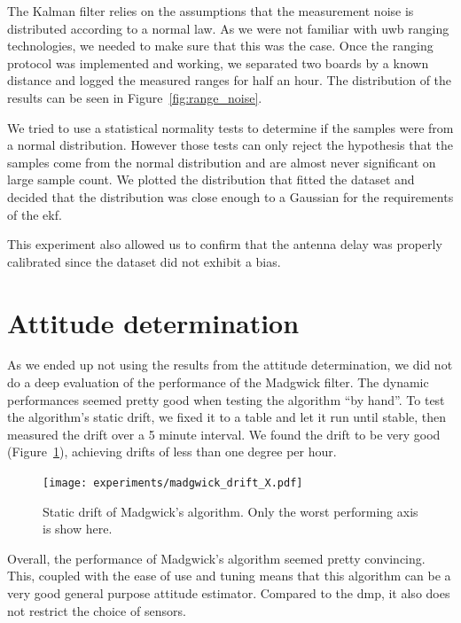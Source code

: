 \documentclass[a4paper, 12pt]{scrreprt}
\begin{document}
The Kalman filter relies on the assumptions that the measurement noise is distributed according to a normal law.
As we were not familiar with \gls{uwb} ranging technologies, we needed to make sure that this was the case.
Once the ranging protocol was implemented and working, we separated two boards by a known distance and logged the measured ranges for half an hour.
The distribution of the results can be seen in Figure~\ref{fig:range_noise}.

We tried to use a statistical normality tests to determine if the samples were from a normal distribution.
However those tests can only reject the hypothesis that the samples come from the normal distribution and are almost never significant on large sample count.
We plotted the distribution that fitted the dataset and decided that the distribution was close enough to a Gaussian for the requirements of the \gls{ekf}.

This experiment also allowed us to confirm that the antenna delay was properly calibrated since the dataset did not exhibit a bias.



\section{Attitude determination}

As we ended up not using the results from the attitude determination, we did not do a deep evaluation of the performance of the Madgwick filter.
The dynamic performances seemed pretty good when testing the algorithm ``by hand''.
To test the algorithm's static drift, we fixed it to a table and let it run until stable, then measured the drift over a 5 minute interval.
We found the drift to be very good (Figure~\ref{fig:madgwick-drift}), achieving drifts of less than one degree per hour.

\begin{figure}[h]
    \centering
    \texttt{[image: experiments/madgwick\_drift\_X.pdf]}
    \caption{Static drift of Madgwick's algorithm.
    Only the worst performing axis is show here.}
    \label{fig:madgwick-drift}
\end{figure}

Overall, the performance of Madgwick's algorithm seemed pretty convincing.
This, coupled with the ease of use and tuning means that this algorithm can be a very good general purpose attitude estimator.
Compared to the \gls{dmp}, it also does not restrict the choice of sensors.
\end{document}
